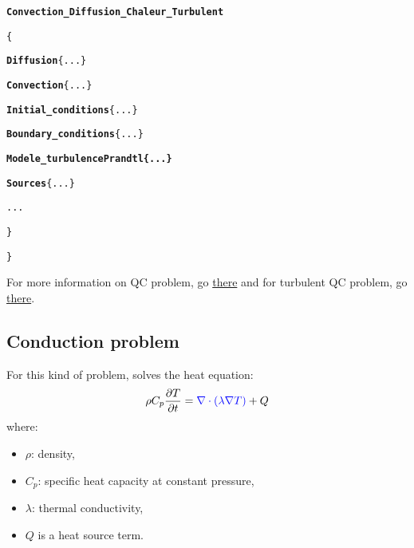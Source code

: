 \begin{center}
{\begin{minipage}[c]{0.95\textwidth}
\begin{alltt}
\hspace{1cm}    {\bf{Convection\_Diffusion\_Chaleur}\textcolor{Greeen}{\_Turbulent}}

\hspace{1cm}    \{

\hspace{2cm}        {\bf{Diffusion}} \{ ... \}

\hspace{2cm}        {\bf{Convection}} \{ ... \}

\hspace{2cm}        {\bf{Initial\_conditions}} \{ ... \}

\hspace{2cm}        {\bf{Boundary\_conditions}} \{ ... \}

\hspace{2cm}        {\bf{\textcolor{Greeen}{Modele\_turbulence Prandtl \{ ... \} } }}

\hspace{2cm}        {\bf{Sources}} \{ ... \}

\hspace{2cm}        ...

\hspace{1cm}    \}

\}
\end{alltt}
\end{minipage}}
\end{center}

For more information on QC problem, go \href{\REFERENCEMANUAL\#pbthermohydrauliqueqc}{there} and for turbulent QC problem, go \href{\REFERENCEMANUAL\#pbthermohydrauliqueturbulentqc}{there}.



\subsection{Conduction problem}
For this kind of problem, \trust solves the heat equation:
$$
\rho C_p \frac{\partial T}{\partial t} = \textcolor{blue}{\nabla \cdot \left(\lambda \nabla T\right)} + Q
$$
where:
\begin{itemize}
\item $\rho$: density,
\item $C_p$: specific heat capacity at constant pressure,
\item $\lambda$: thermal conductivity,
\item $Q$ is a heat source term.
\end{itemize}

